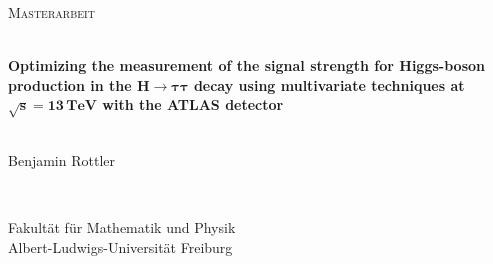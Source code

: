 \begin{titlepage}
    \begin{center}
        \begin{flushleft}
            \Large \textsc{Masterarbeit}\\[0.5cm]
        \end{flushleft}
        \HRule{} \\[0.5cm]
        {\huge \textbf{Optimizing the measurement of the signal strength for Higgs-boson production in the $\bm{H \to \tau\tau}$ decay using multivariate techniques at $\bm{\sqrt{s} = 13\,\text{TeV}}$ with the ATLAS detector}}\\
        \HRule{} \\[0.5cm]
        \begin{flushleft}
            \Large Benjamin Rottler
        \end{flushleft}
        \vfill
        \HRule{} \\
        \begin{flushright}
            \large
            Fakultät für Mathematik und Physik \\
            Albert-Ludwigs-Universität Freiburg
        \end{flushright}
    \end{center}
\end{titlepage}
